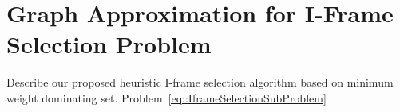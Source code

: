 \section{Graph Approximation for I-Frame Selection Problem}
\label{sec::graphApprox}
{\color{red}Describe our proposed heuristic I-frame selection algorithm based on minimum weight dominating set.}
Problem~\eqref{eq::IframeSelectionSubProblem}
~\cite{MWDS_baseline}
%